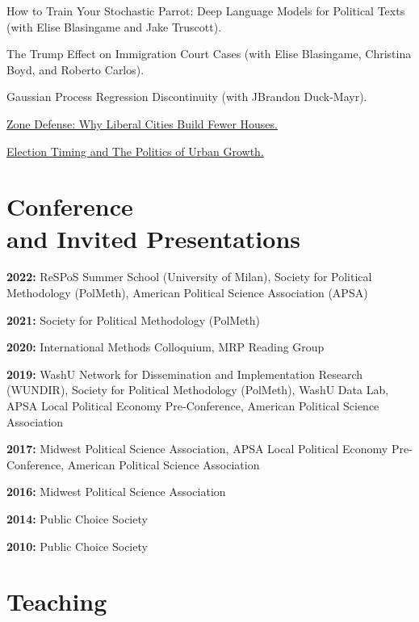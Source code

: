 \documentclass[margin,line]{res}
\newenvironment{publist}{
	\begin{list}{}{%
			\setlength{\itemsep}{0.15in}
			\setlength{\parsep}{0in} \setlength{\parskip}{0in}
			\setlength{\topsep}{0in} \setlength{\partopsep}{0in} 
			\setlength{\leftmargin}{0.15in}
			\setlength{\itemindent}{-0.15in}}}
		{\end{list}}
\begin{document}
\begin{resume}
\begin{publist}
	\item How to Train Your Stochastic Parrot: Deep Language Models for Political Texts (with Elise Blasingame and Jake Truscott).
	\item The Trump Effect on Immigration Court Cases (with Elise Blasingame, Christina Boyd, and Roberto Carlos).
	\item Gaussian Process Regression Discontinuity (with JBrandon Duck-Mayr).
	\item \href{https://joeornstein.github.io/publications/ornstein-zone-defense.pdf}{Zone Defense: Why Liberal Cities Build Fewer Houses.}
	\item \href{https://joeornstein.github.io/publications/Ornstein-ElectionTiming.pdf}{Election Timing and The Politics of Urban Growth.}
\end{publist}

\section{\sc Conference \\and Invited Presentations}

\textbf{2022:} ReSPoS Summer School (University of Milan), Society for Political Methodology (PolMeth), American Political Science Association (APSA)

\textbf{2021:} Society for Political Methodology (PolMeth)

\textbf{2020:} International Methods Colloquium, MRP Reading Group

\textbf{2019:} WashU Network for Dissemination and Implementation Research (WUNDIR), Society for Political Methodology (PolMeth), WashU Data Lab, APSA Local Political Economy Pre-Conference, American Political Science Association

\textbf{2017:} Midwest Political Science Association, APSA Local Political Economy Pre-Conference, American Political Science Association

\textbf{2016:} Midwest Political Science Association

\textbf{2014:} Public Choice Society

\textbf{2010:} Public Choice Society


\section{\sc Teaching}



\end{resume}
\end{document}
